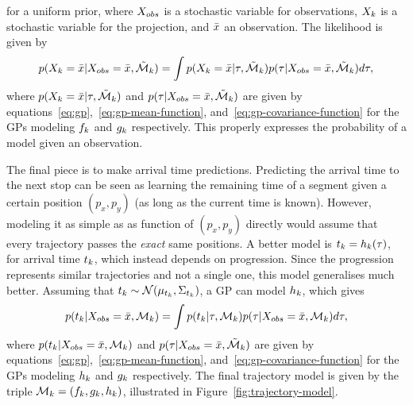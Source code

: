for a uniform prior, where $X_{obs}$ is a stochastic variable for observations,
$X_{k}$ is a stochastic variable for the
projection, and $\bar{x}$ an observation. The likelihood is given by
\begin{equation}
  \label{eq:model-likelihood}
  p(X_{k} = \bar{x} \vert X_{obs} = \bar{x}, \tilde{\mathcal{M}}_{k}) =
  \int p(X_{k} = \bar{x} \vert \tau, \tilde{\mathcal{M}}_{k}) 
  p(\tau \vert X_{obs} = \bar{x}, \tilde{\mathcal{M}}_{k}) d\tau,
\end{equation}
where $p(X_{k} = \bar{x} \vert \tau,
\tilde{\mathcal{M}}_{k})$ and $p(\tau \vert X_{obs} = \bar{x},
\tilde{\mathcal{M}}_{k})$ are given by equations~\ref{eq:gp},~\ref{eq:gp-mean-function},
and~\ref{eq:gp-covariance-function} for the GPs modeling
$f_{k}$ and $g_{k}$ respectively. This properly expresses
the probability of a model given an observation.

The final piece is to make arrival time predictions. Predicting the
arrival time to the next stop can be seen as 
learning the remaining time of a segment given a certain position $(p_x, p_y)$ 
(as long as the current time is known). However, modeling it
as simple as as function of $(p_x, p_y)$ directly would assume that 
every trajectory passes the \textit{exact} same positions. A better model is $t_{k}
= h_{k}(\tau)$, for arrival time $t_{k}$, 
which instead depends on progression. Since the
progression represents similar trajectories and not a single one, this
model generalises much better. Assuming that $t_{k} \sim
\mathcal{N}(\mu_{t_{k}}, \Sigma_{t_{k}})$, a GP can model
$h_{k}$, which gives
\begin{equation}
  \label{eq:arrival-time-probability}
  p(t_{k} \vert X_{obs} = \bar{x}, \mathcal{M}_k) 
  = \int p(t_{k} \vert \tau,
  \mathcal{M}_{k}) p(\tau \vert X_{obs} 
  = \bar{x}, \mathcal{M}_{k}) d\tau,
\end{equation}
where $p(t_{k} \vert X_{obs} = \bar{x}, \mathcal{M}_k)$
and $p(\tau \vert X_{obs} = \bar{x},
\tilde{\mathcal{M}}_{k})$ are given by equations~\ref{eq:gp},~\ref{eq:gp-mean-function},
and~\ref{eq:gp-covariance-function} for the GPs modeling
$h_{k}$ and $g_{k}$ respectively. 
The final trajectory model is given by the triple $\mathcal{M}_{k} = (f_{k}, g_{k}, h_{k})$, illustrated in Figure~\ref{fig:trajectory-model}.

